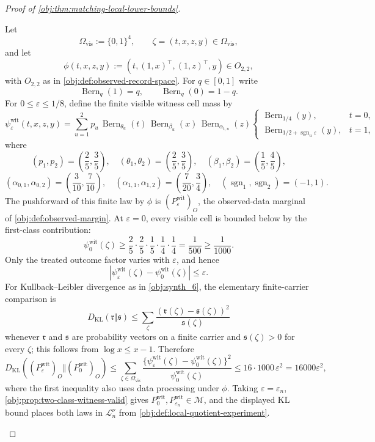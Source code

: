 \documentclass[11pt]{article}
\begin{document}
\begin{proof}[Proof of \cref{obj:thm:matching-local-lower-bounds}]
\begin{enumerate}
Let
\[
\Omega_{\mathrm{vis}}:=\{0,1\}^4,
\qquad
\zeta=(t,x,z,y)\in\Omega_{\mathrm{vis}},
\]
and let
\[
\phi(t,x,z,y):=(t,(1,x)^\top,(1,z)^\top,y)\in O_{2,2},
\]
with \(O_{2,2}\) as in \cref{obj:def:observed-record-space}.  For \(q\in[0,1]\) write
\[
\operatorname{Bern}_q(1)=q,\qquad
\operatorname{Bern}_q(0)=1-q .
\]
For \(0\le\varepsilon\le1/8\), define the finite visible witness cell mass by
\[
\psi^{\mathrm{wit}}_{\varepsilon}(t,x,z,y)
=
\sum_{u=1}^{2}
p_u\,\operatorname{Bern}_{\theta_u}(t)\,
\operatorname{Bern}_{\beta_u}(x)\,
\operatorname{Bern}_{\alpha_{t,u}}(z)
\begin{cases}
\operatorname{Bern}_{1/4}(y),& t=0,\\
\operatorname{Bern}_{1/2+\operatorname{sgn}_u\varepsilon}(y),& t=1,
\end{cases}
\]
where
\[
(p_1,p_2)=\left(\frac25,\frac35\right),\quad
(\theta_1,\theta_2)=\left(\frac25,\frac35\right),\quad
(\beta_1,\beta_2)=\left(\frac15,\frac45\right),
\]
\[
(\alpha_{0,1},\alpha_{0,2})=\left(\frac3{10},\frac7{10}\right),\quad
(\alpha_{1,1},\alpha_{1,2})=\left(\frac7{20},\frac34\right),\quad
(\operatorname{sgn}_1,\operatorname{sgn}_2)=(-1,1).
\]
The pushforward of this finite law by \(\phi\) is \((P_{\varepsilon}^{\mathrm{wit}})_O\), the observed-data marginal of \cref{obj:def:observed-margin}.  At \(\varepsilon=0\), every visible cell is bounded below by the first-class contribution:
\[
\psi^{\mathrm{wit}}_{0}(\zeta)
\ge
\frac25\cdot\frac25\cdot\frac15\cdot\frac14\cdot\frac14
=
\frac1{500}
\ge
\frac1{1000}.
\]
Only the treated outcome factor varies with \(\varepsilon\), and hence
\[
\left|\psi^{\mathrm{wit}}_{\varepsilon}(\zeta)
-\psi^{\mathrm{wit}}_{0}(\zeta)\right|
\le \varepsilon .
\]
For Kullback--Leibler divergence as in \cref{obj:synth_6}, the elementary finite-carrier comparison is
\[
D_{\mathrm{KL}}(\mathfrak r\Vert\mathfrak s)
\le
\sum_{\zeta}\frac{(\mathfrak r(\zeta)-\mathfrak s(\zeta))^2}{\mathfrak s(\zeta)}
\]
whenever \(\mathfrak r\) and \(\mathfrak s\) are probability vectors on a finite carrier and
\(\mathfrak s(\zeta)>0\) for every \(\zeta\); this follows from \(\log x\le x-1\).  Therefore
\[
D_{\mathrm{KL}}\!\left((P_{\varepsilon}^{\mathrm{wit}})_O\Vert(P_0^{\mathrm{wit}})_O\right)
\le
\sum_{\zeta\in\Omega_{\mathrm{vis}}}
\frac{\{\psi^{\mathrm{wit}}_{\varepsilon}(\zeta)-\psi^{\mathrm{wit}}_{0}(\zeta)\}^2}
{\psi^{\mathrm{wit}}_{0}(\zeta)}
\le
16\cdot1000\,\varepsilon^2
=
16000\varepsilon^2,
\]
where the first inequality also uses data processing under \(\phi\).  Taking
\(\varepsilon=\varepsilon_n\), \cref{obj:prop:two-class-witness-valid} gives
\(P_0^{\mathrm{wit}},P_{\varepsilon_n}^{\mathrm{wit}}\in\mathcal M\), and the displayed KL bound places both laws in \(\mathcal L_n^\nu\) from \cref{obj:def:local-quotient-experiment}. %


\end{enumerate}
\end{proof}
\end{document}
